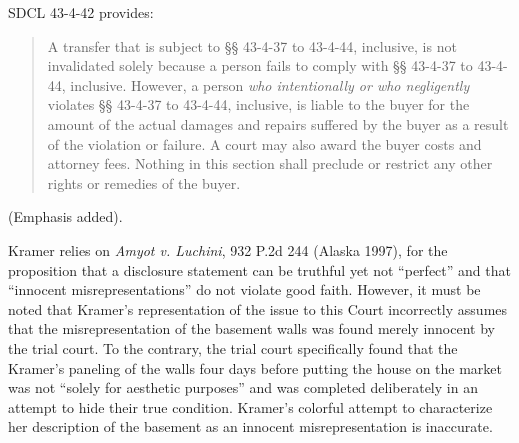 SDCL 43-4-42 provides:
\begin{quote}
A transfer that is subject to {\S}{\S} 43-4-37 to 43-4-44, inclusive, is not
invalidated solely because a person fails to comply with {\S}{\S} 43-4-37 to
43-4-44, inclusive. However, a person \textit{who intentionally or who
negligently} violates {\S}{\S} 43-4-37 to 43-4-44, inclusive, is liable to the
buyer for the amount of the actual damages and repairs suffered by the buyer as
a result of the violation or failure. A court may also award the buyer costs
and attorney fees. Nothing in this section shall preclude or restrict any other
rights or remedies of the buyer.
\end{quote}
(Emphasis added).

Kramer relies on \textit{Amyot v. Luchini}, 932 P.2d 244 (Alaska 1997), for the
proposition that a disclosure statement can be truthful yet not ``perfect'' and
that ``innocent misrepresentations'' do not violate good faith. However, it
must be noted that Kramer's representation of the issue to this Court
incorrectly assumes that the misrepresentation of the basement walls was found
merely innocent by the trial court. To the contrary, the trial court
specifically found that the Kramer's paneling of the walls four days before
putting the house on the market was not ``solely for aesthetic purposes'' and
was completed deliberately in an attempt to hide their true condition. Kramer's colorful
attempt to characterize her description of the basement as an innocent
misrepresentation is inaccurate.

